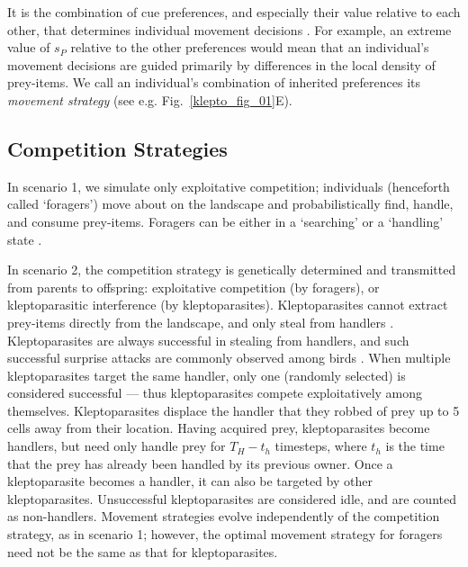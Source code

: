 It is the combination of cue preferences, and especially their value relative to each other, that determines individual movement decisions \parencite[similar to relative selection coefficients,][]{fortin2005,avgar2016,white2018}. 
For example, an extreme value of $s_P$ relative to the other preferences would mean that an individual's movement decisions are guided primarily by differences in the local density of prey-items.
We call an individual's combination of inherited preferences its \textit{movement strategy} (see e.g. Fig.~\ref{klepto_fig_01}E).

\subsection*{Competition Strategies}

In scenario 1, we simulate only exploitative competition; individuals (henceforth called `foragers') move about on the landscape and probabilistically find, handle, and consume prey-items.
Foragers can be either in a `searching' or a `handling' state \parencite{holmgren1995}.

In scenario 2, the competition strategy is genetically determined and transmitted from parents to offspring: exploitative competition (by foragers), or kleptoparasitic interference (by kleptoparasites).
Kleptoparasites cannot extract prey-items directly from the landscape, and only steal from handlers \parencite[see][]{holmgren1995}.
Kleptoparasites are always successful in stealing from handlers, and such successful surprise attacks are commonly observed among birds \parencite{brockmann1979}.
When multiple kleptoparasites target the same handler, only one (randomly selected) is considered successful --- thus kleptoparasites compete exploitatively among themselves.
Kleptoparasites displace the handler that they robbed of prey up to 5 cells away from their location.
Having acquired prey, kleptoparasites become handlers, but need only handle prey for $T_H - t_h$ timesteps, where $t_h$ is the time that the prey has already been handled by its previous owner.
Once a kleptoparasite becomes a handler, it can also be targeted by other kleptoparasites.
Unsuccessful kleptoparasites are considered idle, and are counted as non-handlers.
Movement strategies evolve independently of the competition strategy, as in scenario 1; however, the optimal movement strategy for foragers need not be the same as that for kleptoparasites.

